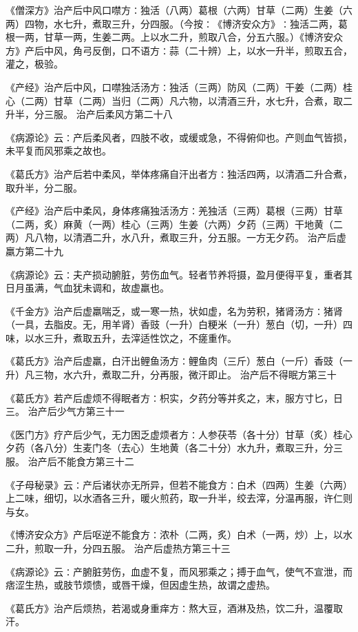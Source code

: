 \documentclass[a4paper,12pt,UTF8,twoside]{ctexbook}
\begin{document}
《僧深方》治产后中风口噤方∶独活（八两）葛根（六两）甘草（二两）生姜（六两）四物，水七升，煮取三升，分四服。（今按∶《博济安众方》∶独活二两，葛根一两，甘草一两，生姜二两。上以水二升，煎取八合，分五六服。）《博济安众方》产后中风，角弓反倒，口不语方∶蒜（二十辨）上，以水一升半，煎取五合，灌之，极验。

《产经》治产后中风，口噤独活汤方∶独活（三两）防风（二两）干姜（二两）桂心（二两）甘草（二两）当归（二两）凡六物，以清酒三升，水七升，合煮，取二升半，分三服。
治产后柔风方第二十八

《病源论》云∶产后柔风者，四肢不收，或缓或急，不得俯仰也。产则血气皆损，未平复而风邪乘之故也。

《葛氏方》治产后若中柔风，举体疼痛自汗出者方∶独活四两，以清酒二升合煮，取升半，分二服。

《产经》治产后中柔风，身体疼痛独活汤方∶羌独活（三两）葛根（三两）甘草（二两，炙）麻黄（一两）桂心（三两）生姜（六两）夕药（三两）干地黄（二两）凡八物，以清酒二升，水八升，煮取三升，分五服。一方无夕药。
治产后虚羸方第二十九

《病源论》云∶夫产损动腑脏，劳伤血气。轻者节养将摄，盈月便得平复，重者其日月虽满，气血犹未调和，故虚羸也。

《千金方》治产后虚羸喘乏，或一寒一热，状如虚，名为劳积，猪肾汤方∶猪肾（一具，去脂皮。无，用羊肾）香豉（一升）白粳米（一升）葱白（切，一升）四味，以水三升，煮取五升，去滓适性饮之，不瘥重作。

《葛氏方》治产后虚羸，白汗出鲤鱼汤方∶鲤鱼肉（三斤）葱白（一斤）香豉（一升）凡三物，水六升，煮取二升，分再服，微汗即止。
治产后不得眠方第三十

《葛氏方》若产后虚烦不得眠者方∶枳实，夕药分等并炙之，末，服方寸匕，日三。
治产后少气方第三十一

《医门方》疗产后少气，无力困乏虚烦者方∶人参茯苓（各十分）甘草（炙）桂心夕药（各八分）生麦门冬（去心）生地黄（各二十分）水九升，煮取三升，分三服。
治产后不能食方第三十二

《子母秘录》云∶产后诸状亦无所异，但若不能食方∶白术（四两）生姜（六两）上二味，细切，以水酒各三升，暖火煎药，取一升半，绞去滓，分温再服，许仁则与女。

《博济安众方》产后呕逆不能食方∶浓朴（二两，炙）白术（一两，炒）上，以水二升，煎取一升，分四五服。
治产后虚热方第三十三

《病源论》云∶产腑脏劳伤，血虚不复，而风邪乘之；搏于血气，使气不宣泄，而痞涩生热，或肢节烦愦，或唇干燥，但因虚生热，故谓之虚热。

《葛氏方》治产后烦热，若渴或身重痒方∶熬大豆，酒淋及热，饮二升，温覆取汗。
\end{document}
